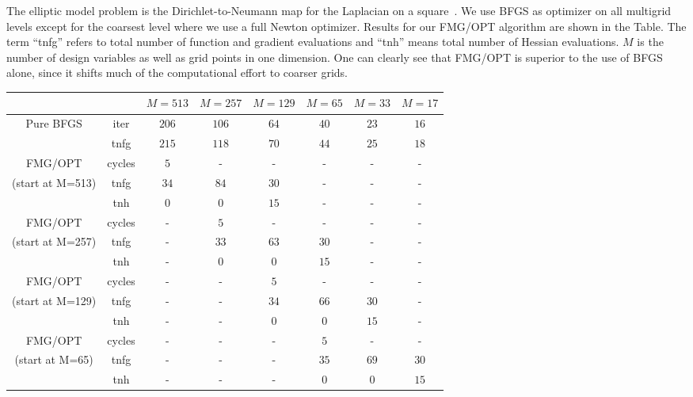 \documentclass{report}
\begin{document}
The elliptic model problem is the Dirichlet-to-Neumann map for the
Laplacian on a square~\cite{Toint2006}.
We use BFGS as optimizer on all multigrid levels except for the coarsest
level where we use a full Newton optimizer.
Results for our FMG/OPT algorithm are shown in the Table. The term
``tnfg'' refers to total number of function and gradient
evaluations and ``tnh'' means total number of Hessian evaluations. $M$ is
the number of design variables as well as grid points in one dimension.
One can clearly see that FMG/OPT is superior to the use of BFGS alone,
since it shifts much of the computational effort to coarser grids.
\begin{table}[h]
\centering
\begin{tabular}{cccccccc}
& & \tiny{$M=513$} & \tiny{$M=257$} & \tiny{$M=129$} & \tiny{$M=65$} &
\tiny{$M=33$} & \tiny{$M=17$} \\
\hline
\tiny{Pure BFGS} & \tiny{iter} & \tiny{$206$} & \tiny{$106$} &
\tiny{$64$} & \tiny{$40$} & \tiny{$23$} & \tiny{$16$} \\
& \tiny{tnfg} & \tiny{$215$} & \tiny{$118$} & \tiny{$70$} & \tiny{$44$} &
\tiny{$25$} & \tiny{$18$} \\
\tiny{FMG/OPT} & \tiny{cycles} & \tiny{$5$} & \tiny{-} & \tiny{-} &
\tiny{-} & \tiny{-} & \tiny{-} \\
\tiny{(start at M=513)} & \tiny{tnfg} & \tiny{$34$} & \tiny{$84$} &
\tiny{$30$} & \tiny{-} & \tiny{-} & \tiny{-} \\
& \tiny{tnh} & \tiny{$0$} & \tiny{$0$} & \tiny{$15$} & \tiny{-} & \tiny{-} & \tiny{-}\\
\tiny{FMG/OPT} & \tiny{cycles} & \tiny{-} & \tiny{$5$} & \tiny{-} &
\tiny{-} & \tiny{-} & \tiny{-} \\
\tiny{(start at M=257)} & \tiny{tnfg} & \tiny{-} & \tiny{$33$} &
\tiny{$63$} & \tiny{$30$} & \tiny{-} & \tiny{-} \\
& \tiny{tnh} & \tiny{-} & \tiny{$0$} & \tiny{$0$} & \tiny{$15$} & \tiny{-} & \tiny{-} \\
\tiny{FMG/OPT} & \tiny{cycles} & \tiny{-} & \tiny{-} & \tiny{$5$} &
\tiny{-} & \tiny{-} & \tiny{-}\\
\tiny{(start at M=129)} & \tiny{tnfg} & \tiny{-} & \tiny{-} & \tiny{$34$}
& \tiny{$66$} & \tiny{$30$} & \tiny{-}\\
& \tiny{tnh} & \tiny{-} & \tiny{-} & \tiny{$0$} & \tiny{$0$} & \tiny{$15$} & \tiny{-}\\
\tiny{FMG/OPT} & \tiny{cycles}& \tiny{-} & \tiny{-} & \tiny{-} &
\tiny{$5$} & \tiny{-} & \tiny{-}\\
\tiny{(start at M=65)} & \tiny{tnfg} & \tiny{-} & \tiny{-} & \tiny{-} &
\tiny{$35$} & \tiny{$69$} & \tiny{$30$} \\
& \tiny{tnh} & \tiny{-} & \tiny{-} & \tiny{-} & \tiny{$0$} & \tiny{$0$} & \tiny{$15$} \\
\hline
\end{tabular}
\end{table}
\end{document}
